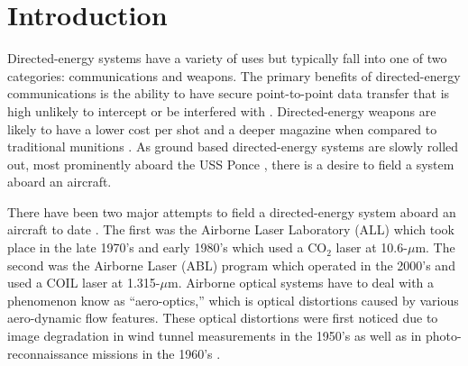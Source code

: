
\chapter{Introduction}
\label{chap:01_intro}

Directed-energy systems have a variety of uses but typically fall into one of two categories: communications and weapons.
The primary benefits of directed-energy communications is the ability to have secure point-to-point data transfer that is high unlikely to intercept or be interfered with \cite{crs-2021-RwNjGeZD}.
Directed-energy weapons are likely to have a lower cost per shot and a deeper magazine when compared to traditional munitions \cite{crs-2021-hyCUE868}.
As ground based directed-energy systems are slowly rolled out, most prominently aboard the USS Ponce \cite{crs-2021-Atxb7GDv}, there is a desire to field a system aboard an aircraft.

There have been two major attempts to field a directed-energy system aboard an aircraft to date \cite{Jumper-2013-8KtN3pue}.
The first was the Airborne Laser Laboratory (ALL) which took place in the late 1970's and early 1980's which used a CO$_2$ laser at 10.6-$\mu$m.
The second was the Airborne Laser (ABL) program which operated in the 2000's and used a COIL laser at 1.315-$\mu$m.
Airborne optical systems have to deal with a phenomenon know as ``aero-optics,'' which is optical distortions caused by various aero-dynamic flow features.
These optical distortions were first noticed due to image degradation in wind tunnel measurements in the 1950's \cite{Stine-1956-UaRzVZCe} as well as in photo-reconnaissance missions in the 1960's \cite{Kyrazis-2013-vwKeEBym}.

